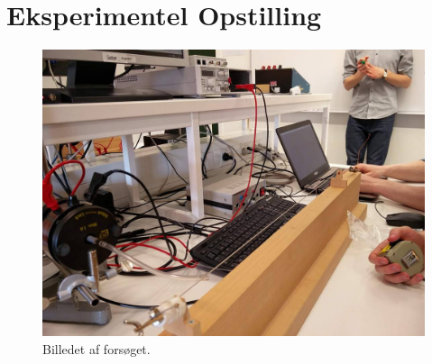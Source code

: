 \documentclass[A2_main.tex]{subfiles}
\begin{document}
\section{Eksperimentel Opstilling}
\begin{figure}[H]
    \includegraphics[width=\linewidth]{opstilling.jpg}
    \caption{Billedet af forsøget.}
    \label{fig:opstilling}
\end{figure}
\end{document}
